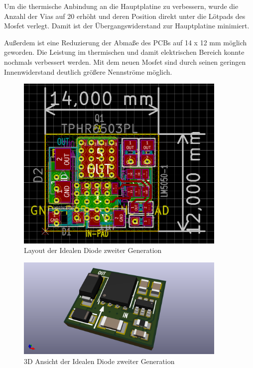 Um die thermische Anbindung an die Hauptplatine zu verbessern, wurde die Anzahl der Vias auf 20 erhöht und deren Position direkt unter die Lötpads des Mosfet verlegt. Damit ist der Übergangswiderstand \cite{Heat_Transfer}zur Hauptplatine minimiert.

Außerdem ist eine Reduzierung der Abmaße des PCBs auf 14 x 12 mm möglich geworden. Die Leistung im thermischen und damit elektrischen Bereich konnte nochmals verbessert werden. Mit dem neuen Mosfet sind durch seinen geringen Innenwiderstand deutlich größere Nennströme möglich.


\begin{figure}[H]
\centering
\includegraphics[width=0.9\textwidth]{bilder/Ideale_Diode/Ideale_Diode_25V_rev00_ver00.png} 
\caption{Layout der Idealen Diode zweiter Generation} 
\label{fig:Layout der Idealen Diode zweiter Generation}
\end{figure}



\begin{figure}[H]
\centering
\includegraphics[width=0.9\textwidth]{bilder/Ideale_Diode/Ideale_Diode_25V_rev00_ver00-3D.png} 
\caption{3D Ansicht der Idealen Diode zweiter Generation} 
\label{fig:3D Ansicht der Idealen Diode zweiter Generation}
\end{figure}


